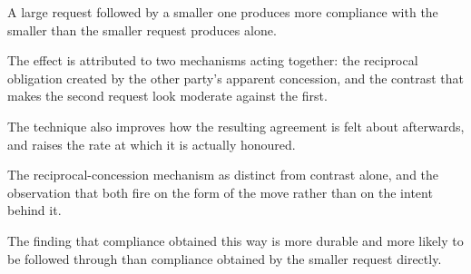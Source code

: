 

\begin{distilled}
  \item A large request followed by a smaller one produces more compliance with the smaller than the smaller request produces alone.
  \item The effect is attributed to two mechanisms acting together: the reciprocal obligation created by the other party's apparent concession, and the contrast that makes the second request look moderate against the first.
  \item The technique also improves how the resulting agreement is felt about afterwards, and raises the rate at which it is actually honoured.
\end{distilled}

\begin{unique}
  \item The reciprocal-concession mechanism as distinct from contrast alone, and the observation that both fire on the form of the move rather than on the intent behind it.
  \item The finding that compliance obtained this way is more durable and more likely to be followed through than compliance obtained by the smaller request directly.
\end{unique}
